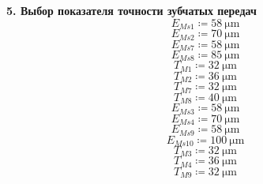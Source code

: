 \documentclass{article}
\newcommand{\defeq}{\coloneq} %
\begin{document}
\colorbox[HTML]{000000}{\textbf{5. Выбор показателя точности зубчатых передач }}\newline
\begin{equation*}
\textit{E}_{\textit{Ms1}} \defeq 58 \: \mathrm{μm}
\end{equation*}
\begin{equation*}
\textit{E}_{\textit{Ms2}} \defeq 70 \: \mathrm{μm}
\end{equation*}
\begin{equation*}
\textit{E}_{\textit{Ms7}} \defeq 58 \: \mathrm{μm}
\end{equation*}
\begin{equation*}
\textit{E}_{\textit{Ms8}} \defeq 85 \: \mathrm{μm}
\end{equation*}
\begin{equation*}
\textit{T}_{\textit{M1}} \defeq 32 \: \mathrm{μm}
\end{equation*}
\begin{equation*}
\textit{T}_{\textit{M2}} \defeq 36 \: \mathrm{μm}
\end{equation*}
\begin{equation*}
\textit{T}_{\textit{M7}} \defeq 32 \: \mathrm{μm}
\end{equation*}
\begin{equation*}
\textit{T}_{\textit{M8}} \defeq 40 \: \mathrm{μm}
\end{equation*}
\begin{equation*}
\textit{E}_{\textit{Ms3}} \defeq 58 \: \mathrm{μm}
\end{equation*}
\begin{equation*}
\textit{E}_{\textit{Ms4}} \defeq 70 \: \mathrm{μm}
\end{equation*}
\begin{equation*}
\textit{E}_{\textit{Ms9}} \defeq 58 \: \mathrm{μm}
\end{equation*}
\begin{equation*}
\textit{E}_{\textit{Ms10}} \defeq 100 \: \mathrm{μm}
\end{equation*}
\begin{equation*}
\textit{T}_{\textit{M3}} \defeq 32 \: \mathrm{μm}
\end{equation*}
\begin{equation*}
\textit{T}_{\textit{M4}} \defeq 36 \: \mathrm{μm}
\end{equation*}
\begin{equation*}
\textit{T}_{\textit{M9}} \defeq 32 \: \mathrm{μm}
\end{equation*}
\end{document}
